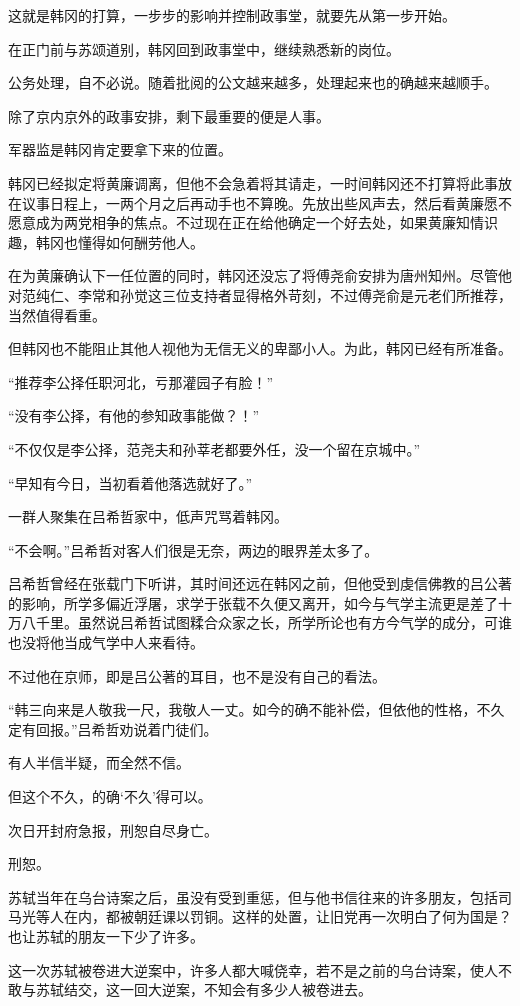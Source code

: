 这就是韩冈的打算，一步步的影响并控制政事堂，就要先从第一步开始。

在正门前与苏颂道别，韩冈回到政事堂中，继续熟悉新的岗位。

公务处理，自不必说。随着批阅的公文越来越多，处理起来也的确越来越顺手。

除了京内京外的政事安排，剩下最重要的便是人事。

军器监是韩冈肯定要拿下来的位置。

韩冈已经拟定将黄廉调离，但他不会急着将其请走，一时间韩冈还不打算将此事放在议事日程上，一两个月之后再动手也不算晚。先放出些风声去，然后看黄廉愿不愿意成为两党相争的焦点。不过现在正在给他确定一个好去处，如果黄廉知情识趣，韩冈也懂得如何酬劳他人。

在为黄廉确认下一任位置的同时，韩冈还没忘了将傅尧俞安排为唐州知州。尽管他对范纯仁、李常和孙觉这三位支持者显得格外苛刻，不过傅尧俞是元老们所推荐，当然值得看重。

但韩冈也不能阻止其他人视他为无信无义的卑鄙小人。为此，韩冈已经有所准备。

“推荐李公择任职河北，亏那灌园子有脸！”

“没有李公择，有他的参知政事能做？！”

“不仅仅是李公择，范尧夫和孙莘老都要外任，没一个留在京城中。”

“早知有今日，当初看着他落选就好了。”

一群人聚集在吕希哲家中，低声咒骂着韩冈。

“不会啊。”吕希哲对客人们很是无奈，两边的眼界差太多了。

吕希哲曾经在张载门下听讲，其时间还远在韩冈之前，但他受到虔信佛教的吕公著的影响，所学多偏近浮屠，求学于张载不久便又离开，如今与气学主流更是差了十万八千里。虽然说吕希哲试图糅合众家之长，所学所论也有方今气学的成分，可谁也没将他当成气学中人来看待。

不过他在京师，即是吕公著的耳目，也不是没有自己的看法。

“韩三向来是人敬我一尺，我敬人一丈。如今的确不能补偿，但依他的性格，不久定有回报。”吕希哲劝说着门徒们。

有人半信半疑，而全然不信。

但这个不久，的确‘不久’得可以。

次日开封府急报，刑恕自尽身亡。

刑恕。

苏轼当年在乌台诗案之后，虽没有受到重惩，但与他书信往来的许多朋友，包括司马光等人在内，都被朝廷课以罚铜。这样的处置，让旧党再一次明白了何为国是？也让苏轼的朋友一下少了许多。

这一次苏轼被卷进大逆案中，许多人都大喊侥幸，若不是之前的乌台诗案，使人不敢与苏轼结交，这一回大逆案，不知会有多少人被卷进去。

